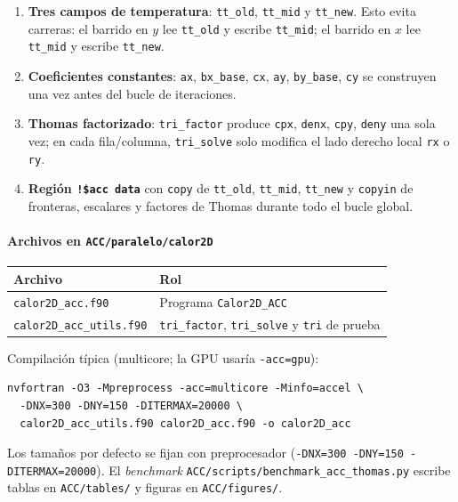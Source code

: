 \documentclass[11pt,a4paper]{article}
\begin{document}
\begin{enumerate}
  \item \textbf{Tres campos de temperatura}: \texttt{tt\_old}, \texttt{tt\_mid}
        y \texttt{tt\_new}. Esto evita carreras: el barrido en $y$ lee
        \texttt{tt\_old} y escribe \texttt{tt\_mid}; el barrido en $x$ lee
        \texttt{tt\_mid} y escribe \texttt{tt\_new}.
  \item \textbf{Coeficientes constantes}: \texttt{ax}, \texttt{bx\_base},
        \texttt{cx}, \texttt{ay}, \texttt{by\_base}, \texttt{cy} se construyen
        una vez antes del bucle de iteraciones.
  \item \textbf{Thomas factorizado}: \texttt{tri\_factor} produce
        \texttt{cpx}, \texttt{denx}, \texttt{cpy}, \texttt{deny} una sola vez;
        en cada fila/columna, \texttt{tri\_solve} solo modifica el lado derecho
        local \texttt{rx} o \texttt{ry}.
  \item \textbf{Regi\'on \texttt{!\$acc data}} con \texttt{copy} de
        \texttt{tt\_old}, \texttt{tt\_mid}, \texttt{tt\_new} y \texttt{copyin}
        de fronteras, escalares y factores de Thomas durante todo el bucle global.
\end{enumerate}

\paragraph{Archivos en \texttt{ACC/paralelo/calor2D}}

\begin{center}
\begin{tabular}{ll}
\hline
Archivo & Rol \\
\hline
\texttt{calor2D\_acc.f90}       & Programa \texttt{Calor2D\_ACC} \\
\texttt{calor2D\_acc\_utils.f90} & \texttt{tri\_factor}, \texttt{tri\_solve} y \texttt{tri} de prueba \\
\hline
\end{tabular}
\end{center}

Compilaci\'on t\'ipica (multicore; la GPU usar\'ia \texttt{-acc=gpu}):

\begin{verbatim}
nvfortran -O3 -Mpreprocess -acc=multicore -Minfo=accel \
  -DNX=300 -DNY=150 -DITERMAX=20000 \
  calor2D_acc_utils.f90 calor2D_acc.f90 -o calor2D_acc
\end{verbatim}

Los tama\~nos por defecto se fijan con preprocesador
(\texttt{-DNX=300 -DNY=150 -DITERMAX=20000}). El \emph{benchmark}
\texttt{ACC/scripts/benchmark\_acc\_thomas.py} escribe tablas en
\texttt{ACC/tables/} y figuras en \texttt{ACC/figures/}.
\end{document}
